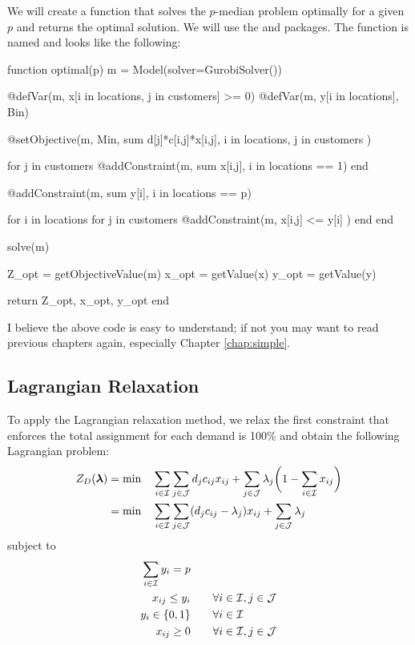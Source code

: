 We will create a \julia{} function that solves the $p$-median problem optimally for a given $p$ and returns the optimal solution. We will use the \jump{} and \gurobi{} packages. The function is named  and looks like the following:
\begin{code}
function optimal(p)
    m = Model(solver=GurobiSolver())

    @defVar(m, x[i in locations, j in customers] >= 0)
    @defVar(m, y[i in locations], Bin)

    @setObjective(m, Min, sum{ d[j]*c[i,j]*x[i,j],
                                 i in locations, j in customers} )

    for j in customers
        @addConstraint(m, sum{ x[i,j], i in locations} == 1)
    end

    @addConstraint(m, sum{ y[i], i in locations} == p)

    for i in locations
        for j in customers
            @addConstraint(m, x[i,j] <= y[i] )
        end
    end

    solve(m)

    Z_opt = getObjectiveValue(m)
    x_opt = getValue(x)
    y_opt = getValue(y)

    return Z_opt, x_opt, y_opt
end
\end{code}
\noindent I believe the above code is easy to understand; if not you may want to read previous chapters again, especially Chapter \ref{chap:simple}.







\subsection{Lagrangian Relaxation}
To apply the Lagrangian relaxation method, we relax the first constraint that enforces the total assignment for each demand is 100\% and obtain the following Lagrangian problem:
\begin{align*}
	Z_D(\boldsymbol{\lambda}) &= \min \quad \sum_{i\in\mathcal{I}} \sum_{j\in\mathcal{J}} d_j c_{ij} x_{ij}
							+ \sum_{j\in\mathcal{J}} \lambda_j \bigg(1 - \sum_{i\in\mathcal{I}} x_{ij} \bigg) \\
 &= \min \quad \sum_{i\in\mathcal{I}} \sum_{j\in\mathcal{J}} ( d_j c_{ij} - \lambda_j ) x_{ij}
			+ \sum_{j\in\mathcal{J}} \lambda_j  \\
\end{align*}
subject to
\begin{align*}
	\sum_{i\in\mathcal{I}} y_i = p & \\
	x_{ij} \leq y_i & \qquad \forall i\in\mathcal{I}, j\in\mathcal{J} \\
	y_i \in \{0,1\} & \qquad \forall i\in\mathcal{I} \\
	x_{ij} \geq 0 & \qquad \forall i\in\mathcal{I}, j\in\mathcal{J}
\end{align*}




